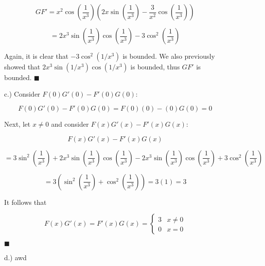 \documentclass[11pt]{article}
\newcommand{\parens}[1]{\left(#1\right)}             %
\begin{document}
\begin{itemize}
\begin{itemize}
        \[GF'
        =x^2\cos\parens{\frac{1}{x^3}}
        \parens{2x\sin\parens{\frac{1}{x^3}}
        -\frac{3}{x^2}\cos\parens{\frac{1}{x^3}}}\]

        \[=2x^3\sin\parens{\frac{1}{x^3}}\cos\parens{\frac{1}{x^3}}-3\cos^2\parens{\frac{1}{x^3}}\]

        Again, it is clear that
        $-3\cos^2(1/x^3)$
        is bounded. We also previously showed that
        $2x^3\sin(1/x^3)\cos(1/x^3)$
        is bounded, thus $GF'$ is bounded. $\blacksquare$

        \pagebreak
        \item [c.)] Consider
        $F(0)G'(0)-F'(0)G(0)$:

        \[F(0)G'(0)-F'(0)G(0)=F(0)(0)-(0)G(0)=0\]

        Next, let
        $x\ne0$
        and consider
        $F(x)G'(x)-F'(x)G(x)$:

        \[F(x)G'(x)-F'(x)G(x)\]
        
        \[=3\sin^2\parens{\frac{1}{x^3}}
        +2x^3\sin\parens{\frac{1}{x^3}}\cos\parens{\frac{1}{x^3}}
        -2x^3\sin\parens{\frac{1}{x^3}}\cos\parens{\frac{1}{x^3}}
        +3\cos^2\parens{\frac{1}{x^3}}
        \]

        \[=3\parens{\sin^2\parens{\frac{1}{x^3}}+\cos^2\parens{\frac{1}{x^3}}}=3(1)=3\]
        
        It follows that

        \[F(x)G'(x)=F'(x)G(x)=\begin{cases}
            3 & x\ne0 \\
            0 & x=0
        \end{cases}\]

        $\blacksquare$

        \item [d.)] awd
    \end{itemize}
\end{itemize}
\end{document}

